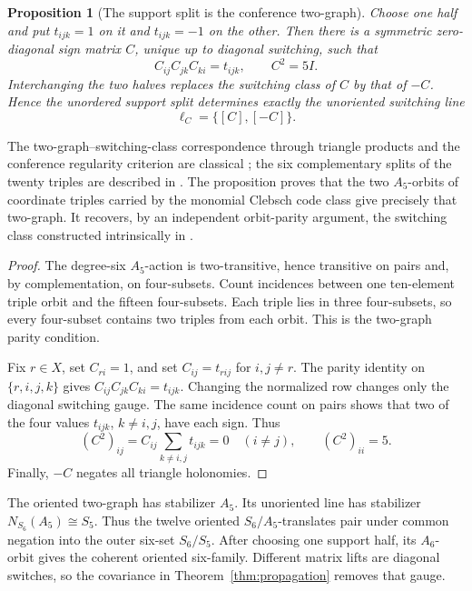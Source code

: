 \documentclass[11pt]{article}
\newtheorem{proposition}[theorem]{Proposition}
\theoremstyle{definition}
\theoremstyle{remark}
\begin{document}
\begin{proposition}[The support split is the conference two-graph]
\label{prop:support-two-graph}
Choose one half and put \(t_{ijk}=1\) on it and \(t_{ijk}=-1\) on the
other.  Then there is a symmetric zero-diagonal sign matrix \(C\), unique
up to diagonal switching, such that
\[
 C_{ij}C_{jk}C_{ki}=t_{ijk},\qquad C^2=5I.
\]
Interchanging the two halves replaces the switching class of \(C\) by
that of \(-C\).  Hence the unordered support split determines exactly the
unoriented switching line
\[
 \ell_C=\{[C],[-C]\}.
\]
\end{proposition}

The two-graph--switching-class correspondence through triangle products
and the conference regularity criterion are classical
\cite[Chapters~5--6]{BMS}; the six complementary splits of the twenty
triples are described in \cite[Section~1.2]{HMSVOuter}.  The proposition
proves that the two \(A_5\)-orbits of coordinate triples carried by the
monomial Clebsch code class give precisely that two-graph.
It recovers, by an independent orbit-parity argument, the switching class
constructed intrinsically in \cite[Theorem~8.2]{RuddRigidity}.

\begin{proof}
The degree-six \(A_5\)-action is two-transitive, hence transitive on pairs
and, by complementation, on four-subsets.  Count incidences between one
ten-element triple orbit and the fifteen four-subsets.  Each triple lies
in three four-subsets, so every four-subset contains two triples from
each orbit.  This is the two-graph parity condition.

Fix \(r\in X\), set \(C_{ri}=1\), and set \(C_{ij}=t_{rij}\) for
\(i,j\ne r\).  The parity identity on \(\{r,i,j,k\}\) gives
\(C_{ij}C_{jk}C_{ki}=t_{ijk}\).  Changing the normalized row changes
only the diagonal switching gauge.  The same incidence count on pairs
shows that two of the four values \(t_{ijk}\), \(k\ne i,j\), have each
sign.  Thus
\[
 (C^2)_{ij}=C_{ij}\sum_{k\ne i,j}t_{ijk}=0
 \quad(i\ne j),
 \qquad (C^2)_{ii}=5.
\]
Finally, \(-C\) negates all triangle holonomies.
\end{proof}

The oriented two-graph has stabilizer \(A_5\).  Its unoriented line has
stabilizer \(N_{S_6}(A_5)\cong S_5\).  Thus the twelve oriented
\(S_6/A_5\)-translates pair under common negation into the outer six-set
\(S_6/S_5\).  After choosing one support half, its \(A_6\)-orbit gives
the coherent oriented six-family.  Different matrix lifts are diagonal
switches, so the covariance in Theorem~\ref{thm:propagation} removes that
gauge.
\end{document}
